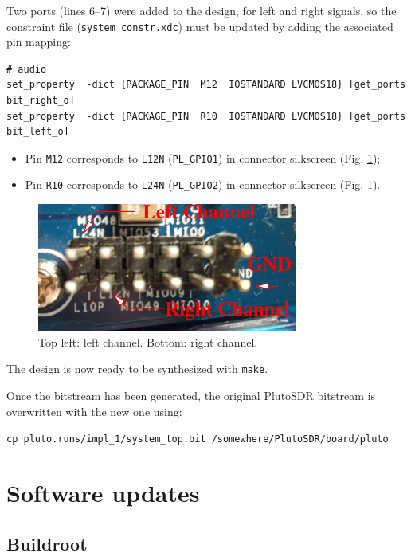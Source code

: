 \documentclass[12pt,oneside]{article}
\begin{document}
Two ports (lines 6--7) were added to the design, for left and right signals, so the constraint 
file ({\tt system\_constr.xdc}) must be updated by adding the associated pin mapping:
\begin{lstlisting} 
# audio
set_property  -dict {PACKAGE_PIN  M12  IOSTANDARD LVCMOS18} [get_ports bit_right_o]
set_property  -dict {PACKAGE_PIN  R10  IOSTANDARD LVCMOS18} [get_ports bit_left_o]
\end{lstlisting} 

\begin{itemize}
\item Pin {\tt M12} corresponds to {\tt L12N} ({\tt PL\_GPIO1}) in connector
silkscreen (Fig. \ref{connector});
\item Pin {\tt R10} corresponds to {\tt L24N} ({\tt PL\_GPIO2}) in connector
silkscreen (Fig. \ref{connector}).
\end{itemize}

\begin{figure}[h!tb]
\begin{center}
\includegraphics[width=.6\textwidth]{./figures/pluto_gpio_connector.pdf}
\end{center}
\caption{Top left: left channel. Bottom: right channel.}
\label{connector}
\end{figure}

The design is now ready to be synthesized with {\tt make}.

Once the bitstream has been generated, the original PlutoSDR bitstream is overwritten
with the new one using:

\verb|cp pluto.runs/impl_1/system_top.bit /somewhere/PlutoSDR/board/pluto|

\section{Software updates}

\subsection{Buildroot}
\end{document}
